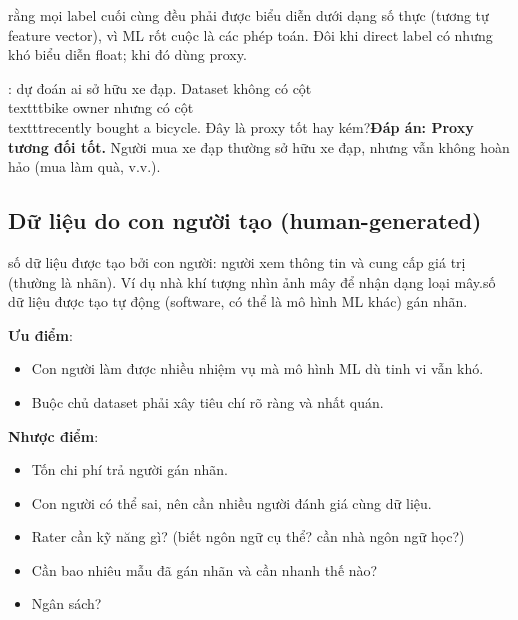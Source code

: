 \documentclass[12pt,a4paper]{article}
\begin{document}
\begin{luuy} rằng mọi label cuối cùng đều phải được biểu diễn dưới dạng số thực (tương tự feature vector), vì ML rốt cuộc là các phép toán. Đôi khi direct label có nhưng khó biểu diễn float; khi đó dùng proxy.\n\end{luuy}

\begin{luuy}[title={Bài tập: gửi coupon cho chủ xe đạp}]\ntarget: dự đoán ai sở hữu xe đạp. Dataset không có cột \\texttt{bike owner} nhưng có cột \\texttt{recently bought a bicycle}. Đây là proxy tốt hay kém?\n\n\textbf{Đáp án: Proxy tương đối tốt.} Người mua xe đạp thường sở hữu xe đạp, nhưng vẫn không hoàn hảo (mua làm quà, v.v.).\n\end{luuy}

\subsection{Dữ liệu do con người tạo (human-generated)}

\begin{ynghia} số dữ liệu được tạo bởi con người: người xem thông tin và cung cấp giá trị (thường là nhãn). Ví dụ nhà khí tượng nhìn ảnh mây để nhận dạng loại mây.\n{} số dữ liệu được tạo tự động (software, có thể là mô hình ML khác) gán nhãn.\n\end{ynghia}

\begin{tinhchat}[title={Ưu và nhược của nhãn do con người}]\n\textbf{Ưu điểm}:\n\begin{itemize}\n  \item Con người làm được nhiều nhiệm vụ mà mô hình ML dù tinh vi vẫn khó.\n  \item Buộc chủ dataset phải xây tiêu chí rõ ràng và nhất quán.\n\end{itemize}\n\textbf{Nhược điểm}:\n\begin{itemize}\n  \item Tốn chi phí trả người gán nhãn.\n  \item Con người có thể sai, nên cần nhiều người đánh giá cùng dữ liệu.\n\end{itemize}\n\end{tinhchat}

\begin{phuongphap}[title={Cần suy nghĩ để quyết định nhu cầu}]\n\begin{itemize}\n  \item Rater cần kỹ năng gì? (biết ngôn ngữ cụ thể? cần nhà ngôn ngữ học?)\n  \item Cần bao nhiêu mẫu đã gán nhãn và cần nhanh thế nào?\n  \item Ngân sách?\n\end{itemize}\n\end{phuongphap}
\end{document}
